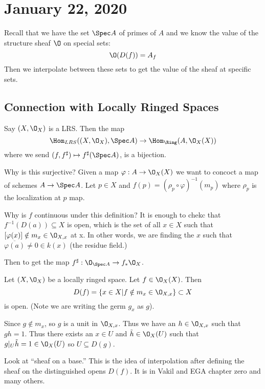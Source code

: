 \documentclass[12pt]{article}
\begin{document}
\section{January 22, 2020}
Recall that we have the set $\Spec A$ of primes of $A$ and we know the value of the structure sheaf $\O$ on special sets:
\[\O(D(f))=A_f\]
Then we interpolate between these sets to get the value of the sheaf at specific sets.

\subsection{Connection with Locally Ringed Spaces}

\begin{prop}
	Say $(X,\O_X)$ is a LRS. Then the map
	\[\Hom_{LRS}((X,\O_X),\Spec A)\to \Hom_{\Ring}(A,\O_X(X))\]
	where we send $(f,f^\sharp)\mapsto f^\sharp(\Spec A)$, is a bijection.
\end{prop}
\begin{prf}
	Why is this surjective? Given a map $\varphi:A\to \O_X(X)$ we want to concoct a map of schemes $A\to\Spec A$.
	Let $p\in X$ and $f(p)=(\rho_p\circ\varphi)^{-1}(m_p)$ where $\rho_p$ is the localization at $p$ map.

	Why is $f$ continuous under this definition? It is enough to chekc that $f^{-1}(D(a))\subseteq X$ is open,
	which is the set of all $x\in X$ such that $[\varphi(x)]\notin m_x\in \O_{X,x}$ at x. In other words, we are finding the $x$ such that $\overline{\varphi(a)}\ne 0\in k(x)$ (the residue field.)

	Then to get the map $f^\sharp:\O_{\Spec A}\to f_\ast\O_X$.
\end{prf}

\begin{lem}
	Let $(X,\O_X)$ be a locally ringed space. Let $f\in\O_X(X)$. Then 
	\[D(f)=\{x\in X|f\notin m_x\in\O_{X,x}\}\subset X\]
	is open. (Note we are writing the germ $g_x$ as $g$).
\end{lem}
\begin{prf}
	Since $g\notin m_x$, so $g$ is a unit in $\O_{X,x}$. Thus we have an $h\in\O_{X,x}$
	such that $gh=1$. Thus there exists an $x\in U$ and $\tilde h\in \O_X(U)$ such that $g|_U\tilde h=1\in\O_X(U)$
	so $U\subseteq D(g)$.
\end{prf}

\begin{rmk}
	Look at ``sheaf on a base.'' This is the idea of interpolation after defining the sheaf on the distinguished 
	opens $D(f)$. It is in Vakil and EGA chapter zero and many others.
\end{rmk}	
\end{document}
